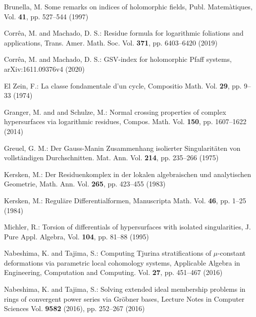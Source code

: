 \documentclass[pdftex]{arxsigma}
\begin{document}
\begin{thebibliography}{99}
Brunella, M. 
\newblock Some remarks on indices of holomorphic fields, 
\newblock Publ. Matem\`atiques, 
Vol. {\bf 41}, pp. 527--544 (1997)

Corr\^ea, M.  and Machado, D. S.:
\newblock Residue formula for logarithmic foliations and applications, 
\newblock Trans. Amer. Math. Soc. 
Vol. {\bf 371}, pp. 6403--6420 (2019)

Corr\^ea, M.  and Machado, D. S.:
\newblock GSV-index for holomorphic Pfaff systems, 
\newblock arXiv:1611.09376v4 (2020)


El Zein, F.:
\newblock La classe fondamentale d'un cycle, 
\newblock Compositio Math.
Vol. {\bf 29}, pp. 9--33 (1974)

Granger, M. and  and Schulze, M.:
\newblock  Normal crossing properties of complex hypersurfaces via logarithmic residues, 
\newblock Compos. Math. 
Vol. {\bf 150}, pp. 1607--1622 (2014)

Greuel, G. M.:
\newblock Der Gauss-Manin Zusammenhang isolierter Singularit\"aten von vollst\"andigen Durchschnitten. 
\newblock Mat. Ann. 
Vol. {\bf 214}, pp. 235--266 (1975)

Kersken, M.:
\newblock Der Residuenkomplex in der lokalen algebraischen und analytischen Geometrie, 
\newblock Math. Ann. Vol. {\bf 265}, pp. 423--455 (1983)

Kersken, M.:
\newblock Regul\"are Differentialformen, 
\newblock Manuscripta Math.
Vol. {\bf 46}, pp. 1--25 (1984)



Michler, R.:
\newblock Torsion of differentials of hypersurfaces with isolated singularities, 
\newblock J. Pure Appl. Algebra,
Vol. {\bf 104}, pp. 81--88 (1995)





Nabeshima, K.  and Tajima, S.: 
\newblock Computing Tjurina stratifications of $\mu$-constant 
deformations via parametric local cohomology systems, 
\newblock Applicable Algebra in Engineering, Computation and Computing. 
Vol. {\bf 27}, pp. 451--467 (2016)



Nabeshima, K.  and Tajima, S.: 
\newblock Solving extended ideal membership problems in rings of 
convergent power series via Gr\"obner bases, 
\newblock Lecture Notes in Computer Sciences 
Vol. {\bf 9582} (2016), pp. 252--267 (2016)



\end{thebibliography}
\end{document}
